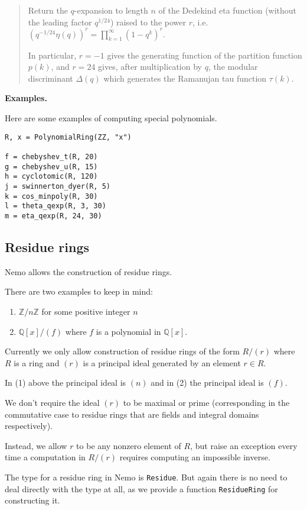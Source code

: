 \documentclass[a4paper,10pt]{article}
\newcommand{\Z}{\mathbb{Z}}
\newcommand{\Q}{\mathbb{Q}}
\newcommand{\code}{\lstinline}
\newcommand{\desc}[1]{\vspace{-3mm}\begin{quote}#1\end{quote}}
\begin{document}
{{{\desc{Return the $q$-expansion to length $n$ of the Dedekind eta function (without 
the leading factor $q^{1/24}$) raised to the power $r$, i.e. $(q^{-1/24} \eta(q))^r 
= \prod_{k=1}^{\infty} (1 - q^k)^r$.

In particular, $r = -1$ gives the generating function of the partition function $p(k)$, 
and $r = 24$ gives, after multiplication by $q$, the modular discriminant $\Delta(q)$ 
which generates the Ramanujan tau function $\tau(k)$.}

\textbf{Examples.}

Here are some examples of computing special polynomials.

\begin{lstlisting}
R, x = PolynomialRing(ZZ, "x")

f = chebyshev_t(R, 20)
g = chebyshev_u(R, 15)
h = cyclotomic(R, 120)
j = swinnerton_dyer(R, 5)
k = cos_minpoly(R, 30)
l = theta_qexp(R, 3, 30)
m = eta_qexp(R, 24, 30)
\end{lstlisting}

\subsection{Residue rings}

Nemo allows the construction of residue rings. 

There are two examples to keep in mind:

\begin{enumerate}
\item $\Z/n\Z$ for some positive integer $n$

\item $\Q[x]/(f)$ where $f$ is a polynomial in $\Q[x]$.
\end{enumerate}

Currently we only allow construction of residue rings of the form $R/(r)$ where
$R$ is a ring and $(r)$ is a principal ideal generated by an element $r \in R$. 

In (1) above the principal ideal is $(n)$ and in (2) the principal
ideal is $(f)$.

We don't require the ideal $(r)$ to be maximal or prime (corresponding in the
commutative case to residue rings that are fields and integral domains 
respectively). 

Instead, we allow $r$ to be any nonzero element of $R$, but raise an exception
every time a computation in $R/(r)$ requires computing an impossible inverse.

The type for a residue ring in Nemo is \code{Residue}. But again there is no
need to deal directly with the type at all, as we provide a function
\code{ResidueRing} for constructing it.

}}}
\end{document}
